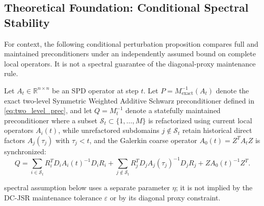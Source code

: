 \documentclass[preprint,12pt,3p]{elsarticle}
\begin{document}
\subsection{Theoretical Foundation: Conditional Spectral Stability}
\label{subsec:theory_stability}

For context, the following conditional perturbation proposition compares full and maintained preconditioners under an independently assumed bound on complete local operators. It is not a spectral guarantee of the diagonal-proxy maintenance rule.

Let $A_t \in \mathbb{R}^{n \times n}$ be an SPD operator at step $t$. Let $P = M_{\text{exact}}^{-1}(A_t)$ denote the exact two-level Symmetric Weighted Additive Schwarz preconditioner defined in \eqref{eq:two_level_prec}, and let $Q = M_t^{-1}$ denote a statefully maintained preconditioner where a subset $\mathcal{S}_t \subset \{1, \dots, M\}$ is refactorized using current local operators $A_i(t)$, while unrefactored subdomains $j \notin \mathcal{S}_t$ retain historical direct factors $A_j(\tau_j)$ with $\tau_j < t$, and the Galerkin coarse operator $A_0(t) = Z^T A_t Z$ is synchronized:
\begin{equation}
Q = \sum_{i \in \mathcal{S}_t} R_i^T D_i A_i(t)^{-1} D_i R_i + \sum_{j \notin \mathcal{S}_t} R_j^T D_j A_j(\tau_j)^{-1} D_j R_j + Z A_0(t)^{-1} Z^T.
\label{eq:stateful_prec_decomp}
\end{equation}

\noindentThe spectral assumption below uses a separate parameter $\eta$; it is not implied by the DC-JSR maintenance tolerance $\varepsilon$ or by its diagonal proxy constraint.
\end{document}
